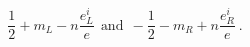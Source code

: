 \begin{equation}
\frac{1}{2} + m_L -n\frac{e_L^i}{e}~~ \mbox{and}~~ -\frac{1}{2} - m_R
+n\frac{e_R^i}{e}~.
\end{equation}

